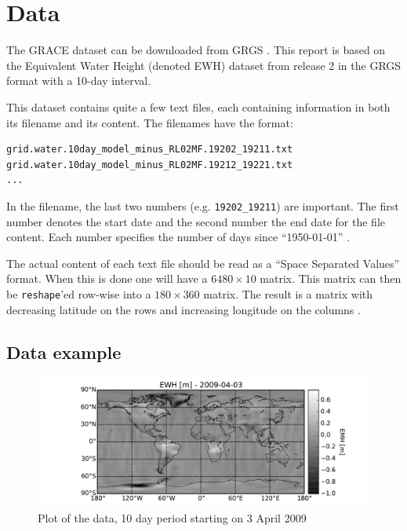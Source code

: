 \section{Data}

The GRACE dataset can be downloaded from GRGS \cite{GRACE-data-source}.
This report is based on the Equivalent Water Height (denoted EWH) dataset from release 2 in the GRGS format with a 10-day interval.

This dataset contains quite a few text files, each containing information in both its filename and its content.
The filenames have the format:

\begin{lstlisting}
grid.water.10day_model_minus_RL02MF.19202_19211.txt
grid.water.10day_model_minus_RL02MF.19212_19221.txt
...
\end{lstlisting}

In the filename, the last two numbers (e.g. \texttt{19202\_19211}) are important.
The first number denotes the start date and the second number the end date for the file content. 
Each number specifies the number of days since ``1950-01-01'' \cite{GRACE-data-format-dates}.

The actual content of each text file should be read as a ``Space Separated Values'' format.
When this is done one will have a $6480 \times 10$ matrix. 
This matrix can then be \texttt{reshape}'ed row-wise into a $180 \times 360$ matrix.
The result is a matrix with decreasing latitude on the rows and increasing longitude on the columns \cite{GRACE-data-format-grids}.

\subsection{Data example}

\begin{figure}[H]
	\centering
	\includegraphics[width=\textwidth]{figures/data-example-world}
	\caption{Plot of the data, 10 day period starting on 3 April 2009}
	\label{fig:data-example-world}
\end{figure}

